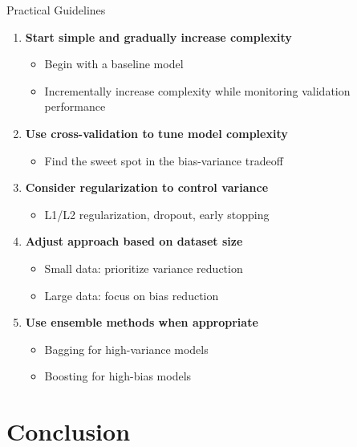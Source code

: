 \documentclass{beamer}
\begin{document}
\begin{frame}{Practical Guidelines}
  \begin{enumerate}
    \item \textbf{Start simple and gradually increase complexity}
    \begin{itemize}
      \item Begin with a baseline model
      \item Incrementally increase complexity while monitoring validation performance
    \end{itemize}
    
    \item \textbf{Use cross-validation to tune model complexity}
    \begin{itemize}
      \item Find the sweet spot in the bias-variance tradeoff
    \end{itemize}
    
    \item \textbf{Consider regularization to control variance}
    \begin{itemize}
      \item L1/L2 regularization, dropout, early stopping
    \end{itemize}
    
    \item \textbf{Adjust approach based on dataset size}
    \begin{itemize}
      \item Small data: prioritize variance reduction
      \item Large data: focus on bias reduction
    \end{itemize}
    
    \item \textbf{Use ensemble methods when appropriate}
    \begin{itemize}
      \item Bagging for high-variance models
      \item Boosting for high-bias models
    \end{itemize}
  \end{enumerate}
\end{frame}

\section{Conclusion}
\end{document}
